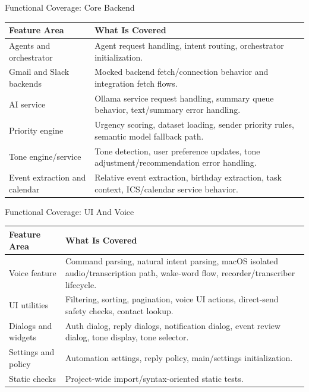 \documentclass[aspectratio=169]{beamer}
\begin{document}
\begin{frame}{Functional Coverage: Core Backend}
  \scriptsize
  \begin{tabularx}{\textwidth}{l X}
    \toprule
    Feature Area & What Is Covered\\
    \midrule
    Agents and orchestrator & Agent request handling, intent routing, orchestrator initialization.\\
    Gmail and Slack backends & Mocked backend fetch/connection behavior and integration fetch flows.\\
    AI service & Ollama service request handling, summary queue behavior, text/summary error handling.\\
    Priority engine & Urgency scoring, dataset loading, sender priority rules, semantic model fallback path.\\
    Tone engine/service & Tone detection, user preference updates, tone adjustment/recommendation error handling.\\
    Event extraction and calendar & Relative event extraction, birthday extraction, task context, ICS/calendar service behavior.\\
    \bottomrule
  \end{tabularx}
\end{frame}

\begin{frame}{Functional Coverage: UI And Voice}
  \scriptsize
  \begin{tabularx}{\textwidth}{l X}
    \toprule
    Feature Area & What Is Covered\\
    \midrule
    Voice feature & Command parsing, natural intent parsing, macOS isolated audio/transcription path, wake-word flow, recorder/transcriber lifecycle.\\
    UI utilities & Filtering, sorting, pagination, voice UI actions, direct-send safety checks, contact lookup.\\
    Dialogs and widgets & Auth dialog, reply dialogs, notification dialog, event review dialog, tone display, tone selector.\\
    Settings and policy & Automation settings, reply policy, main/settings initialization.\\
    Static checks & Project-wide import/syntax-oriented static tests.\\
    \bottomrule
  \end{tabularx}
\end{frame}
\end{document}
